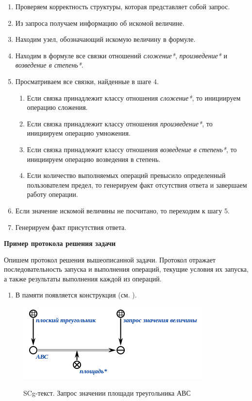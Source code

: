 \begin{enumerate}
	\item
	Проверяем корректность структуры, которая представляет собой запрос.
	\item
	Из запроса получаем информацию об искомой величине.
	\item
	Находим узел, обозначающий искомую величину в формуле.
	\item
	Находим в формуле все связки отношений \textit{сложение*}, \textit{произведение*} и \textit{возведение в степень*}.
	\item
	Просматриваем все связки, найденные в шаге 4.
	
	\begin{enumerate}
		\def\labelenumii{\arabic{enumii}.}
		\item
		Если связка принадлежит классу отношения \textit{сложение*}, то инициируем операцию сложения.
		\item
		Если связка принадлежит классу отношения \textit{произведение*}, то инициируем операцию умножения.
		\item
		Если связка принадлежит классу отношения \textit{возведение в степень*}, то инициируем операцию возведения в степень.
		\item
		Если количество выполняемых операций превысило определенный пользователем предел, то генерируем факт отсутствия ответа и завершаем работу операции.
	\end{enumerate}
	\item
	Если значение искомой величины не посчитано, то переходим к шагу 5.
	\item
	Генерируем факт присутствия ответа.
\end{enumerate}

\textbf{Пример протокола решения задачи}

Опишем протокол решения вышеописанной задачи. Протокол отражает последовательность запуска и выполнения операций, текущие условия их запуска, а также результаты выполнения каждой из операций.

\begin{enumerate}
	\item
	В памяти появляется конструкция (см. ).
\end{enumerate}

\begin{figure}[H]
	\caption{SCg-текст. Запрос значении площади треугольника АВС}
	\includegraphics[scale=0.85]{images/part7/chapter_learning_systems/step1-kbe.png}
	\label{fig:step1}
\end{figure}

